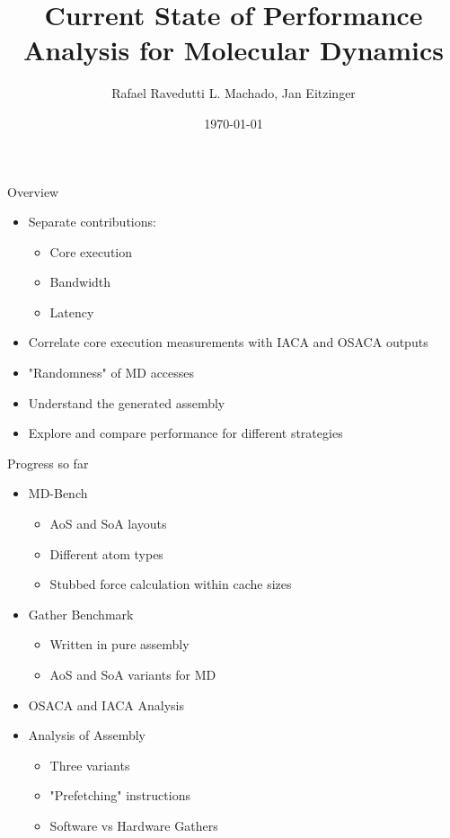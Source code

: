 \documentclass[aspectratio=169,t]{beamer}
\title[MD Performance Analysis]{Current State of Performance Analysis for Molecular Dynamics}
\author[Rafael Ravedutti L. Machado, Jan Eitzinger]{Rafael Ravedutti L. Machado, Jan Eitzinger}
\institute[NHR@FAU]{Erlangen National High Performance Computing Center (NHR@FAU)}
\date{\today}
\begin{document}
  \maketitle

  { %
    \begin{frame}[noframenumbering]{Overview}
        \begin{itemize}
            \item Separate contributions:
            \begin{itemize}
                \item Core execution
                \item Bandwidth
                \item Latency
            \end{itemize}
            \item Correlate core execution measurements with IACA and OSACA outputs
            \item "Randomness" of MD accesses
            \item Understand the generated assembly
            \item Explore and compare performance for different strategies
        \end{itemize}
    \end{frame}
  }
  \begin{frame}[noframenumbering]{Progress so far}
      \begin{itemize}
          \item MD-Bench
          \begin{itemize}
              \item AoS and SoA layouts
              \item Different atom types
              \item Stubbed force calculation within cache sizes
          \end{itemize}
          \item Gather Benchmark
          \begin{itemize}
              \item Written in pure assembly
              \item AoS and SoA variants for MD
          \end{itemize}
          \item OSACA and IACA Analysis
          \item Analysis of Assembly
          \begin{itemize}
              \item Three variants
              \item "Prefetching" instructions
              \item Software vs Hardware Gathers
          \end{itemize}
      \end{itemize}
  \end{frame}
\end{document}
